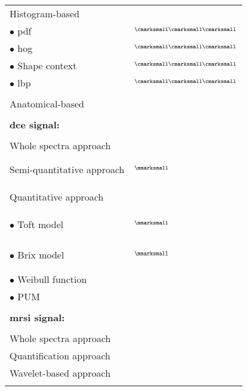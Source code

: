 \begin{longtable}{@{}l >{\raggedleft\arraybackslash}X@{}}
  \quad \quad Histogram-based & \\
  \quad \quad \quad $\bullet$ \acs{pdf} & $^{\text{{\cmarksmall}{\cmarksmall}{\cmarksmall}}}$\cite{Liu2013} \\
  \quad \quad \quad $\bullet$ \acs{hog} & $^{\text{{\cmarksmall}{\cmarksmall}{\cmarksmall}}}$\cite{Liu2013} \\
  \quad \quad \quad $\bullet$ Shape context & $^{\text{{\cmarksmall}{\cmarksmall}{\cmarksmall}}}$\cite{Liu2013} \\
  \quad \quad \quad $\bullet$ \acs{lbp} & $^{\text{{\cmarksmall}{\cmarksmall}{\cmarksmall}}}$\cite{Liu2013} \\ \\ [-1.5ex]
  \quad \quad Anatomical-based & \cite{Litjens2012,Litjens2014,Matulewicz2013} \\ \\ [-1.5ex]
  \textbf{\acs*{dce} signal:} & \\ \\ [-1.5ex]
  \quad Whole spectra approach & \cite{Ampeliotis2007,Ampeliotis2008} \\
  \quad Semi-quantitative approach & $^{\text{{\mmarksmall}}}$\cite{Puech2009}\par \cite{Mazzetti2011,Niaf2011,Niaf2012,Sung2011} \\ \\ [-1.5ex]
  \quad Quantitative approach &  \\ \\ [-1.5ex]
  \quad \quad $\bullet$ Toft model & $^{\text{{\mmarksmall}}}$\cite{Liu2013,Peng2013}\par \cite{Giannini2013,Langer2009,Litjens2011,Litjens2012,Litjens2014,Mazzetti2011,Niaf2011,Niaf2012} \\
  \quad \quad $\bullet$ Brix model & $^{\text{{\mmarksmall}}}$\cite{Artan2009,Artan2010,Ozer2009,Ozer2010}\par \cite{Liu2009,Sung2011} \\
  \quad \quad $\bullet$ Weibull function & \cite{Giannini2013,Mazzetti2011} \\
  \quad \quad $\bullet$ PUM & \cite{Giannini2013,Mazzetti2011} \\ \\ [-1.5ex]
  \textbf{\acs*{mrsi} signal:} & \\ \\ [-1.5ex]
  \quad Whole spectra approach & \cite{Kelm2007,Matulewicz2013,Parfait2012,Tiwari2007,Tiwari2008,Tiwari2009,Tiwari2009a,Tiwari2010,Tiwari2013,Viswanath2008} \\
  \quad Quantification approach & \cite{Kelm2007,Parfait2012} \\
  \quad Wavelet-based approach & \cite{Tiwari2012} \\
  \bottomrule
  \label{tab:feat}
\end{longtable}

